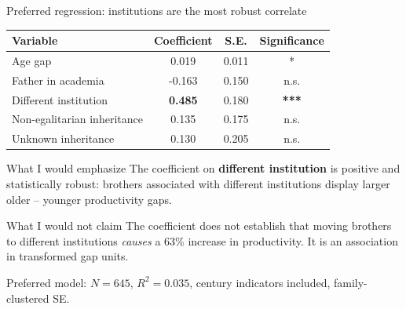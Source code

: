 \documentclass[aspectratio=169,10pt]{beamer}
\begin{document}
\begin{frame}{Preferred regression: institutions are the most robust correlate}
\begin{table}
\centering
\small
\begin{tabular}{lccc}
\toprule
Variable & Coefficient & S.E. & Significance\\
\midrule
Age gap & 0.019 & 0.011 & *\\
Father in academia & -0.163 & 0.150 & n.s.\\
Different institution & \textbf{0.485} & 0.180 & \textbf{***}\\
Non-egalitarian inheritance & 0.135 & 0.175 & n.s.\\
Unknown inheritance & 0.130 & 0.205 & n.s.\\
\bottomrule
\end{tabular}
\end{table}

\vspace{0.35em}
\begin{block}{What I would emphasize}
The coefficient on \textbf{different institution} is positive and statistically robust: brothers associated with different institutions display larger older -- younger productivity gaps.
\end{block}

\begin{alertblock}{What I would not claim}
The coefficient does not establish that moving brothers to different institutions \emph{causes} a 63\% increase in productivity. It is an association in transformed gap units.
\end{alertblock}

{\scriptsize Preferred model: \(N=645\), \(R^2=0.035\), century indicators included, family-clustered SE.}
\end{frame}
\end{document}
